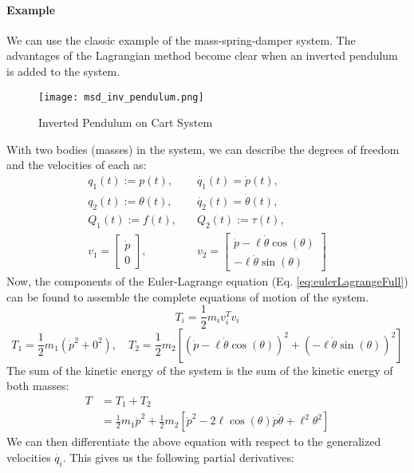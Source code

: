 \documentclass[../notes.tex]{subfiles}
\begin{document}
\paragraph{Example}
We can use the classic example of the mass-spring-damper system. The advantages of the Lagrangian method become clear when an inverted pendulum is added to the system.
\begin{figure}[H]
    \centering
    \texttt{[image: msd\_inv\_pendulum.png]}
    \caption{Inverted Pendulum on Cart System}
    \label{fig:msd_inv_pendulum}
\end{figure}
With two bodies (masses) in the system, we can describe the degrees of freedom and the velocities of each as:
\begin{align*}
    q_1(t) := p(t),& \quad \dot{q_1}(t) = \dot{p}(t), \\
    q_2(t) := \theta(t),& \quad \dot{q_2}(t) = \dot{\theta}(t), \\
    Q_1(t) := f(t),& \quad Q_2(t) := \tau(t), \\
    v_1 = \begin{bmatrix}
        \dot{p} \\ 0
    \end{bmatrix},& \quad
    v_2 = \begin{bmatrix}
        \dot{p} - \ell \dot{\theta}\cos(\theta) \\
        - \ell \dot{\theta}\sin(\theta)
    \end{bmatrix}
\end{align*}
Now, the components of the Euler-Lagrange equation (Eq. \ref{eq:eulerLagrangeFull}) can be found to assemble the complete equations of motion of the system.
\begin{equation*} 
    T_i = \frac{1}{2} m_{i} v^{T}_{i} v_{i} 
\end{equation*}
\begin{equation*}
    T_1 = \frac{1}{2}m_1 (\dot{p}^2 + 0^2), \quad T_2 = \frac{1}{2}m_2 [(\dot{p} - \ell\dot{\theta}\cos(\theta))^2 + (-\ell\dot{\theta}\sin(\theta))^2] 
\end{equation*}
The sum of the kinetic energy of the system is the sum of the kinetic energy of both masses:
\begin{align*}
    T &= T_1 + T_2 \\
    &= \frac{1}{2}m_1 \dot{p}^2 + \frac{1}{2}m_2[\dot{p}^2 - 2\ell \cos(\theta)\dot{p}\dot{\theta} + \ell^2\theta^2]
\end{align*}
We can then differentiate the above equation with respect to the generalized velocities $\dot{q_i}$. This gives us the following partial derivatives:
\end{document}
